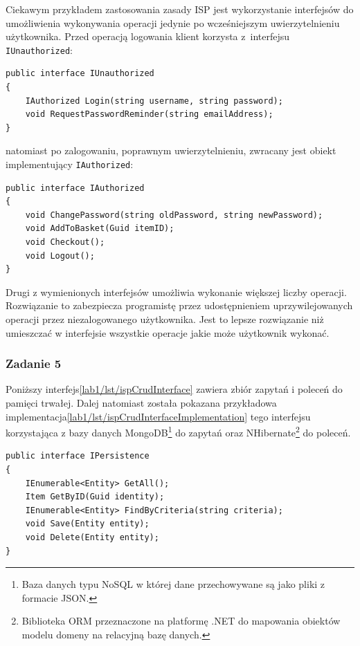 Ciekawym przykładem zastosowania zasady ISP jest wykorzystanie interfejsów do umożliwienia wykonywania operacji jedynie po wcześniejszym uwierzytelnieniu użytkownika. Przed operacją logowania klient korzysta z~interfejsu \texttt{IUnauthorized}:
\begin{lstlisting}
public interface IUnauthorized
{
	IAuthorized Login(string username, string password);
	void RequestPasswordReminder(string emailAddress);
}
\end{lstlisting}
natomiast po zalogowaniu, poprawnym uwierzytelnieniu, zwracany jest obiekt implementujący \texttt{IAuthorized}:
\begin{lstlisting}
public interface IAuthorized
{
	void ChangePassword(string oldPassword, string newPassword);
	void AddToBasket(Guid itemID);
	void Checkout();
	void Logout();
}
\end{lstlisting}
Drugi z wymienionych interfejsów umożliwia wykonanie większej liczby operacji. Rozwiązanie to zabezpiecza programistę przez udostępnieniem uprzywilejowanych operacji przez niezalogowanego użytkownika. Jest to lepsze rozwiązanie niż umieszczać w interfejsie wszystkie operacje jakie może użytkownik wykonać. 

\subsubsection{Zadanie 5}
Poniższy interfejs\ref{lab1/lst/ispCrudInterface} zawiera zbiór zapytań i poleceń do pamięci trwałej. Dalej natomiast została pokazana przykładowa implementacja\ref{lab1/lst/ispCrudInterfaceImplementation} tego interfejsu korzystająca z bazy danych MongoDB\footnote{Baza danych typu NoSQL w której dane przechowywane są jako pliki z formacie JSON.} do zapytań oraz NHibernate\footnote{Biblioteka ORM przeznaczone na platformę .NET do mapowania obiektów modelu domeny na relacyjną bazę danych.} do poleceń.
\begin{lstlisting}[caption={Interfejs zawierający zbiór operacji CRUD}, label={lab1/lst/ispCrudInterface}]
public interface IPersistence
{
	IEnumerable<Entity> GetAll();
	Item GetByID(Guid identity);
	IEnumerable<Entity> FindByCriteria(string criteria);
	void Save(Entity entity);
	void Delete(Entity entity);
}
\end{lstlisting}

